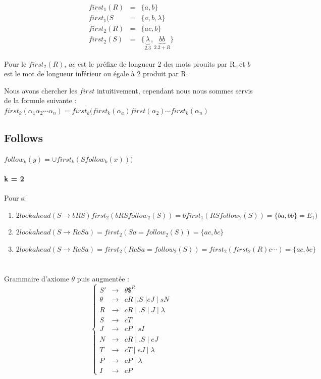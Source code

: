 \documentclass[12pt,a4paper,openany]{book}
\begin{document}
\begin{eqnarray*}
	first_1(R) &=&\{a,b\}\\
	first_1(S &=&  \{a,b,\lambda\}\\
	first_2(R) &=& \{ac,b\}\\
	first_2(S) &=& \{\underbrace{\lambda}_{2.3},\underbrace{bb}_{2.2 + R}\}
\end{eqnarray*}
\begin{remarque}
	Pour le $first_2(R)$, $ac$ est le préfixe de longueur 2 des mots prouits par R, et $b$ est le mot de longueur inférieur ou égale à 2 produit par
	R.
\end{remarque}

Nous avons chercher les $first$ intuitivement, cependant nous nous sommes servis de la formule suivante : $first_k(\alpha_1 \alpha_2 \cdots \alpha_n) =
first_k(first_k(\alpha_a)first(\alpha_2) \cdots first_k(\alpha_n)$

\subsection{Follows}
\begin{remarque}
	$follow_k(y) = \cup first_k(S follow_k(x)))$
\end{remarque}

\paragraph{k = 2}
Pour s:
\begin{enumerate}
	\item $2lookahead(S \rightarrow bRS) first_2 (bRS follow_2(S)) = b first_1(RS follow_2(S)) = \{ba,bb\} = E_1)$
	\item $2lookahead(S \rightarrow RcSa) = first_2(Sa = follow_2(S)) = \{ac,bc\}$
	\item $2lookahead(S \rightarrow RcSa) = first_2(RcSa = follow_2(S)) = first_2(first_2(R)c\cdots) = \{ac,bc\}$
\end{enumerate}
\section{}
Grammaire d'axiome $\theta$ puis augmentée : 
\begin{displaymath}
	\left \{\begin{array}{ccc}
	S' &\rightarrow& \theta\$^R	\\
	\theta &\rightarrow& cR\;|.S\;|eJ\;|\;sN\\
	R &\rightarrow& cR \;|\; .S \;|\; J \;|\; \lambda\\
	S &\rightarrow& cT\\
	J &\rightarrow& cP\;|\;sI\\
	N &\rightarrow& cR\;|\;.S\;|\;eJ\\
	T &\rightarrow& cT\;|\;eJ\;|\;\lambda\\
	P &\rightarrow& cP\; |\;\lambda\\
	I &\rightarrow& cP
\end{array} \right .
\end{displaymath}
\end{document}
